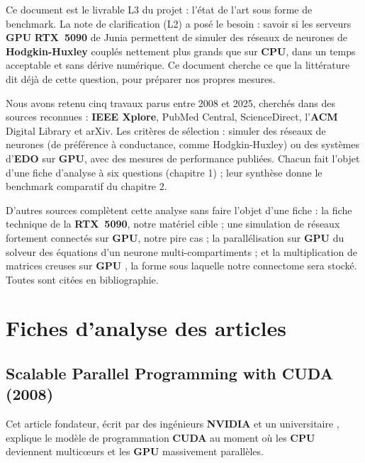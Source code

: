 \documentclass{report}
\begin{document}
Ce document est le livrable L3 du projet : l'état de l'art sous forme de benchmark. La note de clarification (L2) a posé le besoin : savoir si les serveurs \textbf{GPU} \textbf{RTX~5090} de Junia permettent de simuler des réseaux de neurones de \textbf{Hodgkin-Huxley} couplés nettement plus grands que sur \textbf{CPU}, dans un temps acceptable et sans dérive numérique. Ce document cherche ce que la littérature dit déjà de cette question, pour préparer nos propres mesures.

Nous avons retenu cinq travaux parus entre 2008 et 2025, cherchés dans des sources reconnues : \textbf{IEEE Xplore}, PubMed Central, ScienceDirect, l'\textbf{ACM} Digital Library et arXiv. Les critères de sélection : simuler des réseaux de neurones (de préférence à conductance, comme Hodgkin-Huxley) ou des systèmes d'\textbf{EDO} sur \textbf{GPU}, avec des mesures de performance publiées. Chacun fait l'objet d'une fiche d'analyse à six questions (chapitre 1) ; leur synthèse donne le benchmark comparatif du chapitre 2.

D'autres sources complètent cette analyse sans faire l'objet d'une fiche : la fiche technique de la \textbf{RTX~5090}, notre matériel cible \cite{techpowerup} ; une simulation de réseaux fortement connectés sur \textbf{GPU}, notre pire cas \cite{golosio2021} ; la parallélisation sur \textbf{GPU} du solveur des équations d'un neurone multi-compartiments \cite{vooturi2018} ; et la multiplication de matrices creuses sur \textbf{GPU} \cite{bell2009}, la forme sous laquelle notre connectome sera stocké. Toutes sont citées en bibliographie.

\chapter{Fiches d'analyse des articles}

\section{Scalable Parallel Programming with CUDA (2008)}

Cet article fondateur, écrit par des ingénieurs \textbf{NVIDIA} et un universitaire \cite{nickolls2008}, explique le modèle de programmation \textbf{CUDA} au moment où les \textbf{CPU} deviennent multicœurs et les \textbf{GPU} massivement parallèles.
\end{document}
